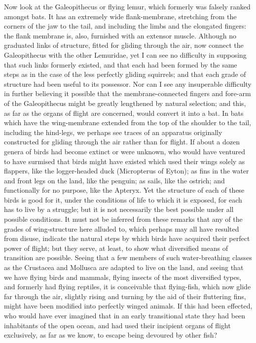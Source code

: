 Now look at the Galeopithecus or flying lemur, which formerly was falsely ranked amongst bats. It has an extremely wide flank-membrane, stretching from the corners of the jaw to the tail, and including the limbs and the elongated fingers: the flank membrane is, also, furnished with an extensor muscle. Although no graduated links of structure, fitted for gliding through the air, now connect the Galeopithecus with the other Lemuridae, yet I can see no difficulty in supposing that such links formerly existed, and that each had been formed by the same steps as in the case of the less perfectly gliding squirrels; and that each grade of structure had been useful to its possessor. Nor can I see any insuperable difficulty in further believing it possible that the membrane-connected fingers and fore-arm of the Galeopithecus might be greatly lengthened by natural selection; and this, as far as the organs of flight are concerned, would convert it into a bat. In bats which have the wing-membrane extended from the top of the shoulder to the tail, including the hind-legs, we perhaps see traces of an apparatus originally constructed for gliding through the air rather than for flight.
If about a dozen genera of birds had become extinct or were unknown, who would have ventured to have surmised that birds might have existed which used their wings solely as flappers, like the logger-headed duck (Micropterus of Eyton); as fins in the water and front legs on the land, like the penguin; as sails, like the ostrich; and functionally for no purpose, like the Apteryx. Yet the structure of each of these birds is good for it, under the conditions of life to which it is exposed, for each has to live by a struggle; but it is not necessarily the best possible under all possible conditions. It must not be inferred from these remarks that any of the grades of wing-structure here alluded to, which perhaps may all have resulted from disuse, indicate the natural steps by which birds have acquired their perfect power of flight; but they serve, at least, to show what diversified means of transition are possible.
Seeing that a few members of such water-breathing classes as the Crustacea and Mollusca are adapted to live on the land, and seeing that we have flying birds and mammals, flying insects of the most diversified types, and formerly had flying reptiles, it is conceivable that flying-fish, which now glide far through the air, slightly rising and turning by the aid of their fluttering fins, might have been modified into perfectly winged animals. If this had been effected, who would have ever imagined that in an early transitional state they had been inhabitants of the open ocean, and had used their incipient organs of flight exclusively, as far as we know, to escape being devoured by other fish?
